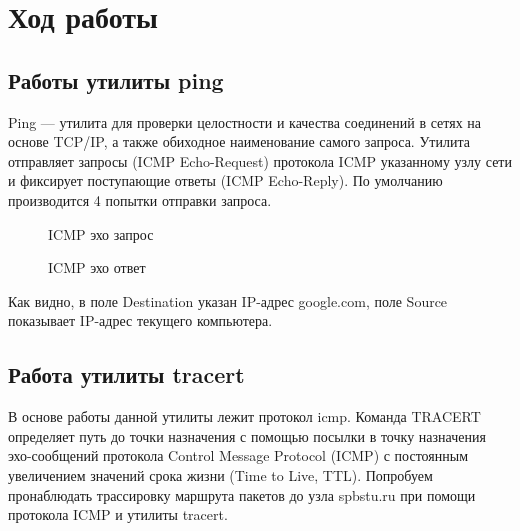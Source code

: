 \documentclass[a4paper, 14pt,russian]{article}
\begin{document}
\section{Ход работы}

\subsection{Работы утилиты ping}
	Ping — утилита для проверки целостности и качества соединений в сетях на основе TCP/IP, а также обиходное наименование самого запроса.	Утилита отправляет запросы (ICMP Echo-Request) протокола ICMP указанному узлу сети и фиксирует поступающие ответы (ICMP Echo-Reply). По умолчанию производится 4 попытки отправки запроса.

	\begin{figure}[h!]
		\caption{ICMP эхо запрос}
		\label{img:ping_req}
	\end{figure}

	\begin{figure}[h!]
		\caption{ICMP эхо ответ}
		\label{img:ping_ans}
	\end{figure}

	Как видно, в поле Destination указан IP-адрес google.com, поле Source показывает IP-адрес текущего компьютера.
	
\subsection{Работа утилиты tracert}
	В основе работы данной утилиты лежит протокол icmp. Команда TRACERT определяет путь до точки назначения с помощью посылки в точку назначения эхо-сообщений протокола Control Message Protocol (ICMP) с постоянным увеличением значений срока жизни (Time to Live, TTL).
	Попробуем пронаблюдать трассировку маршрута пакетов до узла spbstu.ru при помощи протокола ICMP и утилиты tracert. 
\end{document}
